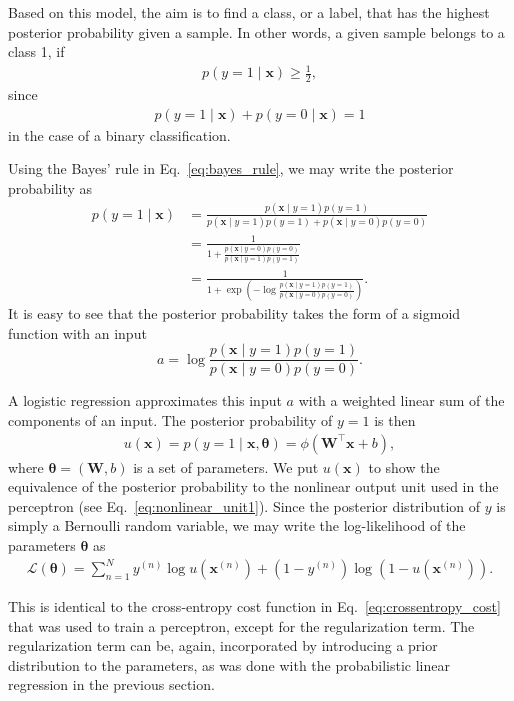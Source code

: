 \documentclass[dissertation,nocontribution,draft*]{aaltoseries}
\newcommand{\vect}[1]{\mathbf{#1}}
\newcommand{\vects}[1]{\boldsymbol{#1}}
\newcommand{\matr}[1]{\mathbf{#1}}
\newcommand{\vx}[0]{\vect{x}}
\newcommand{\mW}[0]{\matr{W}}
\newcommand{\TT}[0]{{\vects{\theta}}}
\newcommand{\LL}[0]{\mathcal{L}}
\begin{document}
Based on this model, the aim is to find a class, or a label,
that has the highest posterior probability given a sample.
In other words, a given sample belongs to a class 1, if
\begin{align*}
    p(y = 1 \mid \vx) \geq \frac{1}{2},
\end{align*}
since
\begin{align*}
    p(y = 1 \mid \vx) + p(y = 0 \mid \vx) = 1
\end{align*}
in the case of a binary classification.

Using the Bayes' rule in Eq.~\eqref{eq:bayes_rule}, we may
write the posterior probability as
\begin{align*}
    p(y = 1 \mid \vx) &= \frac{p(\vx \mid y = 1) p(y = 1)}{
    p(\vx \mid y = 1)p(y = 1) + p(\vx \mid y = 0) p(y = 0)}
    \\
    &= \frac{1}{1 + \frac{p(\vx \mid y = 0) p(y = 0)}{p(\vx
    \mid y = 1) p(y = 1)}} \\
    &= \frac{1}{1 + \exp\left(-\log \frac{p(\vx \mid y = 1) p(y = 1)}{p(\vx
    \mid y = 0) p(y = 0)}\right)}.
\end{align*}
It is easy to see that the posterior probability takes the
form of a sigmoid function with an input 
\[
a = \log \frac{p(\vx \mid y = 1) p(y = 1)}{p(\vx
    \mid y = 0) p(y = 0)}.
\]

A logistic regression approximates this input $a$ with a
weighted linear sum of the components of an input. The
posterior probability of $y=1$ is then
\begin{align*}
    u(\vx)  = p(y = 1 \mid \vx, \TT) = \phi\left( \mW^\top \vx + b
    \right),
\end{align*}
where $\TT = (\mW, b)$ is a set of parameters. We put
$u(\vx)$ to show the equivalence of the posterior
probability to the nonlinear output unit used in the
perceptron (see Eq.~\eqref{eq:nonlinear_unit1}). Since the
posterior distribution of $y$ is simply a Bernoulli random
variable, we may write the log-likelihood of the
parameters $\TT$ as
\begin{align}
    \label{eq:logreg_ll}
    \LL(\TT) = \sum_{n=1}^N y^{(n)} \log u(\vx^{(n)}) + (1 -
    y^{(n)})\log (1 - u(\vx^{(n)})).
\end{align}

This is identical to the cross-entropy cost function
in Eq.~\eqref{eq:crossentropy_cost} that was used
to train a perceptron, except for the regularization term.
The regularization term can be, again, incorporated by
introducing a prior distribution to the parameters, as was
done with the probabilistic linear regression in the
previous section.
\end{document}
